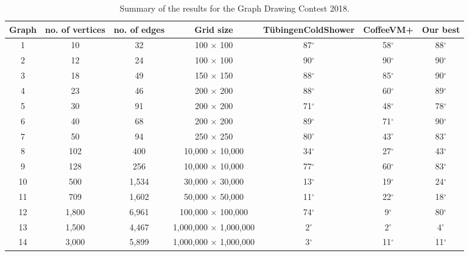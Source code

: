 \documentclass{comjnl}
\begin{document}
\begin{table}
\caption{Summary of the results for the Graph Drawing Contest 2018.}
\centering
\begin{tabular}{c|c|c|c|c|c|c}
\toprule
\rowcolor{gray!30!} Graph & no. of vertices & no. of edges  & Grid size & T\"ubingenColdShower & CoffeeVM+ & Our best \\
\midrule
\rowcolor{gray!30!} 1  & 10    & 32    & 100 $\times$ 100             & 87$^\circ$ & 58$^\circ$ & 88$^\circ$\\
\rowcolor{gray!00!} 2  & 12    & 24    & 100 $\times$ 100             & 90$^\circ$ & 90$^\circ$ & 90$^\circ$\\
\rowcolor{gray!30!} 3  & 18    & 49    & 150 $\times$ 150             & 88$^\circ$ & 85$^\circ$ & 90$^\circ$\\
\rowcolor{gray!00!} 4  & 23    & 46    & 200 $\times$ 200             & 88$^\circ$ & 60$^\circ$ & 89$^\circ$\\
\rowcolor{gray!30!} 5  & 30    & 91    & 200 $\times$ 200             & 71$^\circ$ & 48$^\circ$ & 78$^\circ$\\
\rowcolor{gray!00!} 6  & 40    & 68    & 200 $\times$ 200             & 89$^\circ$ & 71$^\circ$ & 90$^\circ$\\
\rowcolor{gray!30!} 7  & 50    & 94    & 250 $\times$ 250             & 80$^\circ$ & 43$^\circ$ & 83$^\circ$\\
\rowcolor{gray!00!} 8  & 102   & 400   & 10,000 $\times$ 10,000       & 34$^\circ$ & 27$^\circ$ & 43$^\circ$\\
\rowcolor{gray!30!} 9  & 128   & 256   & 10,000 $\times$ 10,000       & 77$^\circ$ & 60$^\circ$ & 83$^\circ$\\
\rowcolor{gray!00!} 10 & 500   & 1,534 & 30,000 $\times$ 30,000       & 13$^\circ$ & 19$^\circ$ & 24$^\circ$\\
\rowcolor{gray!30!} 11 & 709   & 1,602 & 50,000 $\times$ 50,000       & 11$^\circ$ & 22$^\circ$ & 18$^\circ$\\
\rowcolor{gray!00!} 12 & 1,800 & 6,961 & 100,000 $\times$ 100,000     & 74$^\circ$ &  9$^\circ$ & 80$^\circ$\\
\rowcolor{gray!30!} 13 & 1,500 & 4,467 & 1,000,000 $\times$ 1,000,000 &  2$^\circ$ &  2$^\circ$ & 4$^\circ$\\
\rowcolor{gray!00!} 14 & 3,000 & 5,899 & 1,000,000 $\times$ 1,000,000 &  3$^\circ$ & 11$^\circ$ & 11$^\circ$\\
\bottomrule
\end{tabular}
\label{tab:gdContest2018}
\end{table}
\end{document}

